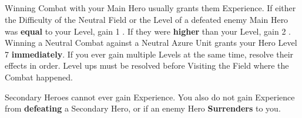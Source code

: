 \begin{multicols*}{2}
\subsection*{}

Winning Combat with your Main Hero usually grants them Experience.
If either the Difficulty of the Neutral Field or the Level of a defeated enemy Main Hero was \textbf{equal} to your Level, gain 1 .
If they were \textbf{higher} than your Level, gain 2 .
Winning a Neutral Combat against a Neutral Azure  Unit grants your Hero Level 7 \textbf{immediately}.
If you ever gain multiple Levels at the same time, resolve their effects in order.
Level ups must be resolved before Visiting the Field where the Combat happened.\par
Secondary Heroes cannot ever gain Experience.
You also do not gain Experience from \textbf{defeating} a Secondary Hero, or if an enemy Hero \textbf{Surrenders} to you.

\end{multicols*}

\clearpage



